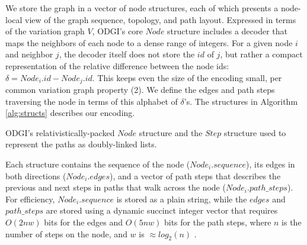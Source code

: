 \documentclass{bioinfo}
\begin{document}
We store the graph in a vector of node structures, each of which presents a node-local view of the graph sequence, topology, and path layout.
Expressed in terms of the variation graph $V$, ODGI's core $Node$ structure includes a decoder that maps the neighbors of each node to a dense range of integers.
For a given node $i$ and neighbor $j$, the decoder itself does not store the $id$ of $j$, but rather a compact representation of the relative difference between the node ids: $\delta = Node_i.id - Node_j.id$.
This keeps even the size of the encoding small, per common variation graph property (2).
We define the edges and path steps traversing the node in terms of this alphabet of $\delta$'s.
The structures in Algorithm \ref{alg:structs} describes our encoding.

\begin{algorithm}
\caption{ODGI's relativistically-packed $Node$ structure and the $Step$ structure used to represent the paths as doubly-linked lists.}
\label{alg:structs}
\end{algorithm}


Each structure contains the sequence of the node ($Node_i.sequence$), its edges in both directions ($Node_i.edges$), and a vector of path steps that describes the previous and next steps in paths that walk across the node ($Node_i.path\_steps$).
For efficiency, $Node_i.sequence$ is stored as a plain string, while the $edges$ and $path\_steps$ are stored using a dynamic succinct integer vector that requires $O(2nw)$ bits for the edges and $O(5nw)$ bits for the path steps, where $n$ is the number of steps on the node, and $w$ is $\approx log_2(n)$ \citep{prezza2017framework}.
\end{document}
